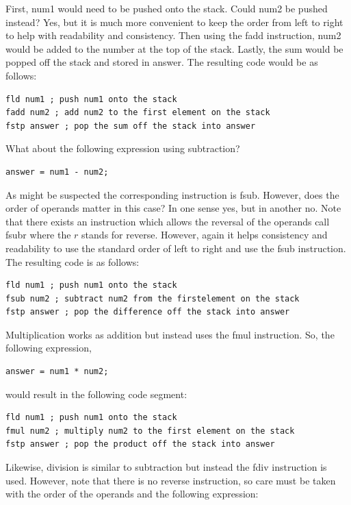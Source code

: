 \documentclass[10pt]{book}
\begin{document}
First, num1 would need to be pushed onto the stack. Could num2 be pushed instead? Yes, but it is much more convenient to keep the order from left to right to help with readability and consistency. Then using the fadd instruction, num2 would be added to the number at the top of the stack. Lastly, the sum would be popped off the stack and stored in answer. The resulting code would be as follows:

\begin{verbatim}
fld num1 ; push num1 onto the stack
fadd num2 ; add num2 to the first element on the stack
fstp answer ; pop the sum off the stack into answer
\end{verbatim}

What about the following expression using subtraction?

\begin{verbatim}
answer = num1 - num2;
\end{verbatim}

As might be suspected the corresponding instruction is fsub. However, does the order of operands matter in this case? In one sense yes, but in another no. Note that there exists an instruction which allows the reversal of the operands call fsubr where the $r$ stands for reverse. However, again it helps consistency and readability to use the standard order of left to right and use the fsub instruction. The resulting code is as follows:

\begin{verbatim}
fld num1 ; push num1 onto the stack
fsub num2 ; subtract num2 from the firstelement on the stack
fstp answer ; pop the difference off the stack into answer
\end{verbatim}

Multiplication works as addition but instead uses the fmul instruction. So, the following expression,

\begin{verbatim}
answer = num1 * num2;
\end{verbatim}

would result in the following code segment:

\begin{verbatim}
fld num1 ; push num1 onto the stack
fmul num2 ; multiply num2 to the first element on the stack
fstp answer ; pop the product off the stack into answer
\end{verbatim}

Likewise, division is similar to subtraction but instead the fdiv instruction is used. However, note that there is no reverse instruction, so care must be taken with the order of the operands and the following expression:
\end{document}
